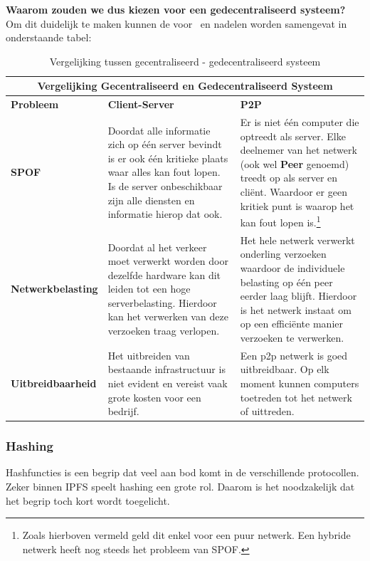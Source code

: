 \textbf{Waarom zouden we dus kiezen voor een gedecentraliseerd systeem?} Om dit duidelijk te maken kunnen de voor~ en nadelen worden samengevat in onderstaande tabel:\\

\begin{table}[h!]
	\centering
	\begin{tabular}{ |p{3cm}|p{6cm}|p{6cm}|}
		\hline
		\multicolumn{3}{|c|}{Vergelijking Gecentraliseerd en Gedecentraliseerd Systeem}\\
		\hline
		\textbf{Probleem}&\textbf{Client-Server}&\textbf{P2P}\\
		\hline
		\textbf{SPOF}&Doordat alle informatie zich op één server bevindt is er ook één kritieke plaats waar alles kan fout lopen. Is de server onbeschikbaar zijn alle diensten en informatie hierop dat ook.& Er is niet één computer die optreedt als server. Elke deelnemer van het netwerk (ook wel \textbf{Peer} genoemd) treedt op als server en cliënt. Waardoor er geen kritiek punt is waarop het kan fout lopen is.\footnote{Zoals hierboven vermeld geld dit enkel voor een puur netwerk. Een hybride netwerk heeft nog steeds het probleem van SPOF.}\\
		\hline
		\textbf{Netwerkbelasting}&Doordat al het verkeer moet verwerkt worden door dezelfde hardware kan dit leiden tot een hoge serverbelasting. Hierdoor kan het verwerken van deze verzoeken traag verlopen.&Het hele netwerk verwerkt onderling verzoeken waardoor de individuele belasting op één peer eerder laag blijft. Hierdoor is het netwerk instaat om op een efficiënte manier verzoeken te verwerken.\\
		\hline
		\textbf{Uitbreidbaarheid}&Het uitbreiden van bestaande infrastructuur is niet evident en vereist vaak grote kosten voor een bedrijf.&Een p2p netwerk is goed uitbreidbaar. Op elk moment kunnen computers toetreden tot het netwerk of uittreden.\\
		\hline
	\end{tabular}
	\label{tbl_concepts}
	\caption{Vergelijking tussen gecentraliseerd - gedecentraliseerd systeem}
\end{table}
\newpage
\subsubsection{Hashing}
\label{hashing}
Hashfuncties is een begrip dat veel aan bod komt in de verschillende protocollen.  Zeker binnen IPFS speelt hashing een grote rol. Daarom is het noodzakelijk dat het begrip toch kort wordt toegelicht.\\

